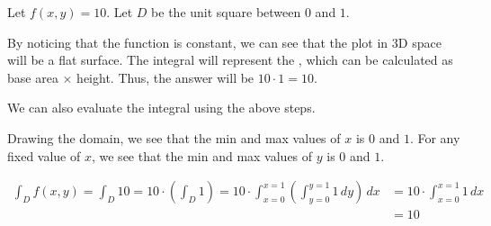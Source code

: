 \begin{example}
    Let $f(x, y) = 10$. Let $D$ be the unit square between $0$ and $1$. 
    
    By noticing that the function is constant, we can see that the plot in 3D space will be a flat surface. The integral will represent the , which can be calculated as base area $\times$ height. Thus, the answer will be $10 \cdot 1 = 10$.

    We can also evaluate the integral using the above steps.

    Drawing the domain, we see that the min and max values of $x$ is $0$ and $1$. For any fixed value of $x$, we see that the min and max values of $y$ is $0$ and $1$.

    \begin{center}
    \end{center}
    \begin{align*}
        \int_D f(x,y)   = \int_D 10
                        = 10 \cdot \left( \int_D 1 \right)
                        = 10 \cdot \int_{x=0}^{x=1} \left( \int_{y=0}^{y=1} 1 \,dy \right) \,dx
                      & = 10 \cdot \int_{x=0}^{x=1} 1 \,dx                                      \\
                      & = 10
    \end{align*}
\end{example}

